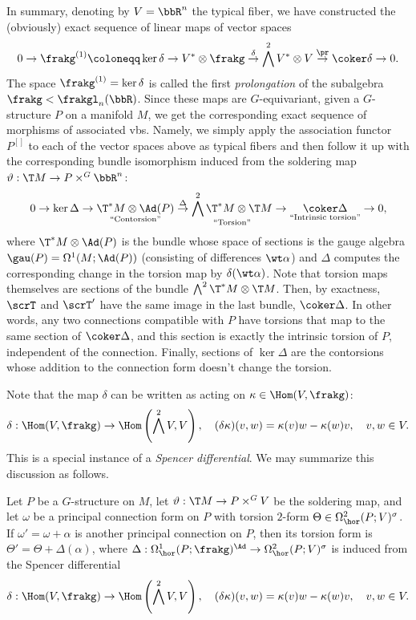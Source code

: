 In summary, denoting by $V=\bbR^n$ the typical fiber, we have constructed the (obviously) exact sequence of linear maps of vector spaces
\[0\to\frakg^{(1)}\coloneqq\ker\delta\to V^\ast\otimes\frakg\overset{\delta}{\to}\bigwedge^2 V^\ast \otimes V\overset{\pr}{\to}\coker\delta\to 0.\]
The space $\frakg^{(1)}=\ker\delta$ is called the first \emph{prolongation} of the subalgebra $\frakg<\frakgl_n(\bbR)$. Since these maps are $G$-equivariant, given a $G$-structure $P$ on a manifold $M$, we get the corresponding exact sequence of morphisms of associated \glspl{vb}. Namely, we simply apply the association functor $P^{[]}$ to each of the vector spaces above as typical fibers and then follow it up with the corresponding bundle isomorphism induced from the soldering map $\vartheta:\T M\to P\times^G \bbR^n$:
\[ 0\to \ker \Delta \to \underset{\text{``Contorsion''}}{\T^\ast M\otimes \Ad(P)}\overset{\Delta}{\to} \underset{\text{``Torsion''}}{\bigwedge^2 \T^\ast M\otimes \T M}\to \underset{\text{``Intrinsic torsion''}}{\coker \Delta}\to 0,\]
where $ \T^\ast M\otimes \Ad(P)$ is the bundle whose space of sections is the gauge algebra $\gau(P)=\Omega^1(M;\Ad(P))$ (consisting of differences $\wt\alpha$) and $\Delta$ computes  the corresponding change in the torsion map by $\delta(\wt\alpha)$. Note that torsion maps themselves are sections of the bundle $\bigwedge^2 \T^\ast M\otimes \T M$. Then, by exactness, $\scrT$ and $\scrT'$ have the same image in the last bundle, $\coker\Delta$. In other words, any two connections compatible with $P$ have torsions that map to the same section of $\coker\Delta$, and this section is exactly the intrinsic torsion of $P$, independent of the connection. Finally, sections of $\ker\Delta$ are the contorsions whose addition to the connection form doesn't change the torsion.

Note that the map $\delta$ can be written as acting on $\kappa\in\Hom(V,\frakg)$:
\[\delta:\Hom(V,\frakg)\to \Hom\left(\bigwedge^2 V,V\right),\quad (\delta\kappa)(v,w)=\kappa(v) w-\kappa(w) v,\quad v,w\in V.\]
This is a special instance  of a \emph{Spencer differential}. We may summarize this discussion as follows.

\begin{prop}
    Let $P$ be a $G$-structure on $M$, let $\vartheta:\T M\to P\times^G V$ be the soldering map, and let $\omega$ be a principal connection form on $P$ with torsion $2$-form $\Theta\in\Omega^2_{\hor}(P;V)^\sigma$. If $\omega'=\omega+\alpha$ is another principal connection on $P$, then its torsion form is $\Theta'=\Theta+\Delta(\alpha)$, where $\Delta:\Omega^1_{\hor}(P;\frakg)^\Ad\to \Omega^2_{\hor}(P;V)^\sigma$ is induced from the Spencer differential 
    \[\delta:\Hom(V,\frakg)\to \Hom\left(\bigwedge^2 V,V\right),\quad (\delta\kappa) (v,w)=\kappa(v)w-\kappa(w)v,\quad v,w\in V.\]
\end{prop}

